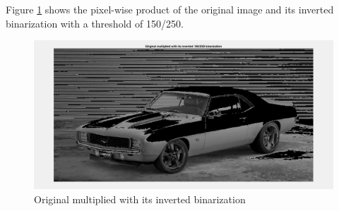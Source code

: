 Figure \ref{fig:task21} shows the pixel-wise product of the original image and its inverted binarization with a threshold of 150/250.

\begin{figure}[!hbt]
  \includegraphics[width=\textwidth]{./img/task21.png}
  \caption{Original multiplied with its inverted binarization}
  \label{fig:task21}
\end{figure}